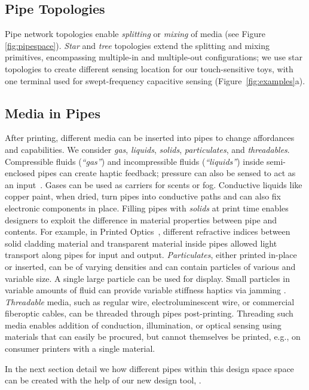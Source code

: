 \subsection{Pipe Topologies}
Pipe network topologies enable \emph{splitting} or \emph{mixing} of media (see Figure \ref{fig:pipespace}).  \emph{Star} and \emph{tree} topologies extend the splitting and mixing primitives, encompassing multiple-in and multiple-out configurations; we use star topologies to create different sensing location for our touch-sensitive toys, with one terminal used for swept-frequency capacitive sensing (Figure~\ref{fig:examples}a).

\subsection{Media in Pipes}
After printing, different media can be inserted into pipes to change affordances and capabilities. We consider \emph{gas}, \emph{liquids}, \emph{solids}, \emph{particulates}, and \emph{threadables}. 
%
Compressible fluids (\emph{``gas''}) and incompressible fluids (\emph{``liquids''})  inside semi-enclosed pipes can create haptic feedback; pressure can also be sensed to act as an input~\cite{Slyper-shape}. Gases can be used as carriers for scents or fog. Conductive liquids like copper paint, when dried, turn pipes into conductive paths and can also fix electronic components in place.
%
Filling pipes with \emph{solids} at print time enables designers to exploit the difference in material properties between pipe and contents. For example, in Printed Optics~\cite{Willis-printedoptics}, different refractive indices between solid cladding material and transparent material inside pipes allowed light transport along pipes for input and output.
%
\emph{Particulates}, either printed in-place or inserted, can be of varying densities and can contain particles of various and variable size.  A single large particle can be used for display.  Small particles in variable amounts of fluid can provide variable stiffness haptics via jamming \cite{Follmer-jamming}.
%
\emph{Threadable} media, such as regular wire, electroluminescent wire, or commercial fiberoptic cables, can be threaded through pipes post-printing. Threading such media enables addition of conduction, illumination, or optical sensing using materials that can easily be procured, but cannot themselves be printed, e.g., on consumer printers with a single material. 

In the next section detail we how different pipes within this design space space can be created with the help of our new design tool, \systemnamenospace.
